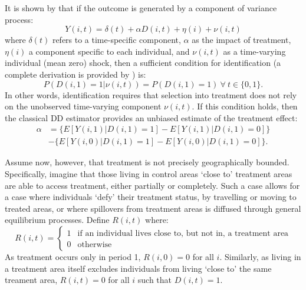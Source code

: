 \documentclass{article}
\begin{document}
\begin{spacing}{1.1}
It is shown by \citet{AshenfelterCard1985} that if the outcome is generated by
a component of variance process:
\begin{equation}
\label{Seqn:COV}
Y(i,t)=\delta(t) + \alpha D(i,t)+\eta(i)+\nu(i,t)
\end{equation}
where $\delta(t)$ refers to a time-specific component, $\alpha$ as the impact of 
treatment, $\eta(i)$ a component specific to each individual, and $\nu(i,t)$ as 
a time-varying individual (mean zero) shock, then a sufficient condition for 
identification (a complete derivation is provided by \citet{Abadie2005}) is:
\begin{equation}
\label{Seqn:ID}
P(D(i,1)=1|\nu(i,t))=P(D(i,1)=1) \ \forall\ t\in\{0,1\}.
\end{equation}
In other words, identification requires that selection into treatment does not
rely on the unobserved time-varying component $\nu(i,t)$.  If this condition 
holds, then the classical DD estimator provides an unbiased estimate of the
treatment effect:
\begin{equation}
\label{Seqn:DD}
\begin{split}
\alpha&=\{E[Y(i,1)|D(i,1)=1]-E[Y(i,1)|D(i,1)=0]\} \\
      &-\{E[Y(i,0)|D(i,1)=1]-E[Y(i,0)|D(i,1)=0]\}.
\end{split}
\end{equation}

Assume now, however, that treatment is not precisely geographically bounded.  
Specifically, imagine that those living in control areas `close to' treatment 
areas are able to access treatment, either partially or completely.  Such a 
case allows for a case where individuals `defy' their treatment status, by 
travelling or moving to treated areas, or where spillovers from treatment 
areas is diffused through general equilibrium processes.  Define $R(i,t)$ 
where:
\begin{equation}
 R(i,t) =
  \begin{cases}
   1   & \text{if an individual lives close to, but not in, a treatment area} \\
   0   & \text{otherwise} 
  \end{cases}
\end{equation}
As treatment occurs only in period 1, $R(i,0)=0$ for all $i$.  Similarly, as 
living in a treatment area itself excludes individuals from living `close to' 
the same treament area, $R(i,t)=0$ for all $i$ such that $D(i,t)=1$.


\end{spacing}
\end{document}
